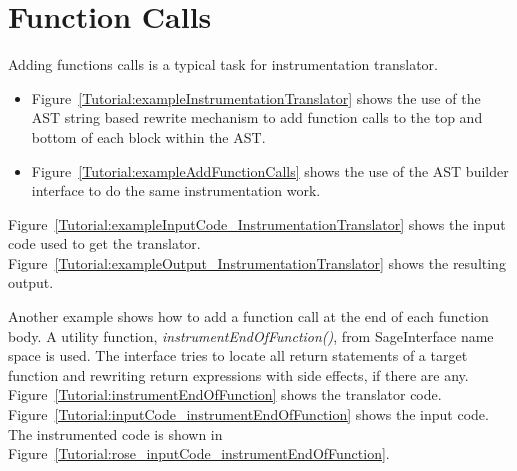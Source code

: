 \clearpage
\section{Function Calls}
Adding functions calls is a typical task for instrumentation translator. 
\begin{itemize}
\item Figure~\ref{Tutorial:exampleInstrumentationTranslator} shows the use of
the AST string based rewrite mechanism to add function calls to the top and bottom of 
each block within the AST.

\item Figure~\ref{Tutorial:exampleAddFunctionCalls} shows the use of
the AST builder interface to do the same instrumentation work.
\end{itemize}
   Figure~\ref{Tutorial:exampleInputCode_InstrumentationTranslator} shows the
input code used to get the translator.
Figure~\ref{Tutorial:exampleOutput_InstrumentationTranslator} shows the resulting output.

Another example shows how to add a function call at the end of each
function body. A utility function, \textit{instrumentEndOfFunction()}, from SageInterface name space is used. 
The interface tries to locate all return statements of a target function 
 and rewriting return expressions with side effects, if there are any. 
 Figure~\ref{Tutorial:instrumentEndOfFunction} shows the translator code. 
 Figure~\ref{Tutorial:inputCode_instrumentEndOfFunction} shows the input
 code. The instrumented code is shown in
 Figure~\ref{Tutorial:rose_inputCode_instrumentEndOfFunction}.

